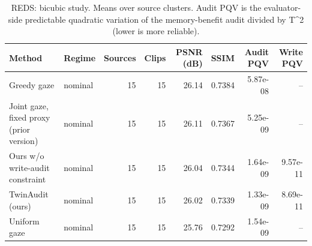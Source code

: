 \begin{table}[t]
\centering
\caption{REDS: bicubic study. Means over source clusters. Audit PQV is the evaluator-side predictable quadratic variation of the memory-benefit audit divided by T^2 (lower is more reliable).}
\label{tab:bicubic_REDS}
\small
\begin{tabular}{llrrrrrr}
\toprule
Method & Regime & Sources & Clips & PSNR (dB) & SSIM & Audit PQV & Write PQV \\
\midrule
Greedy gaze & nominal & 15 & 15 & 26.14 & 0.7384 & 5.87e-08 & -- \\
Joint gaze, fixed proxy (prior version) & nominal & 15 & 15 & 26.11 & 0.7367 & 5.25e-09 & -- \\
Ours w/o write-audit constraint & nominal & 15 & 15 & 26.04 & 0.7344 & 1.64e-09 & 9.57e-11 \\
TwinAudit (ours) & nominal & 15 & 15 & 26.02 & 0.7339 & 1.33e-09 & 8.69e-11 \\
Uniform gaze & nominal & 15 & 15 & 25.76 & 0.7292 & 1.54e-09 & -- \\
\bottomrule
\end{tabular}
\end{table}
